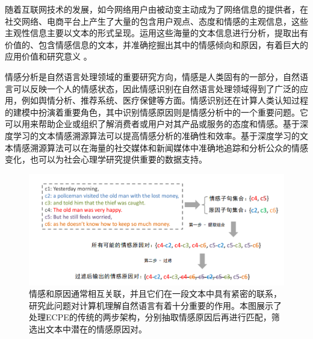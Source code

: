 



\label{sec:1.1}

随着互联网技术的发展，如今网络用户由被动变主动成为了网络信息的提供者，在社交网络、电商平台上产生了大量的包含用户观点、态度和情感的主观信息，这些主观性信息主要以文本的形式呈现。运用这些海量的文本信息进行分析，提取出有价值的、包含情感信息的文本，并准确挖掘出其中的情感倾向和原因，有着巨大的应用价值和研究意义  。

情感分析是自然语言处理领域的重要研究方向，情感是人类固有的一部分，自然语言可以反映一个人的情感状态，因此情感识别在自然语言处理领域得到了广泛的应用，例如舆情分析、推荐系统、医疗保健等方面。情感识别还在计算人类认知过程的建模中扮演着重要角色，其中识别情感原因则是情感分析中的一个重要问题。它可以用来帮助企业或组织了解消费者或用户对其产品或服务的态度和情感。基于深度学习的文本情感溯源算法可以提高情感分析的准确性和效率。基于深度学习的文本情感溯源算法可以在海量的社交媒体和新闻媒体中准确地追踪和分析公众的情感变化，也可以为社会心理学研究提供重要的数据支持。



\begin{figure}[ht]
	\centering
    \includegraphics[width=0.95\linewidth]{figures/2step.png}
	\caption{情感和原因通常相互关联，并且它们在一段文本中具有紧密的联系，研究此问题对计算机理解自然语言有着十分重要的作用。本图展示了处理ECPE的传统的两步架构，分别抽取情感原因后再进行匹配，筛选出文本中潜在的情感原因对。}
    \label{fig:2step}
\end{figure}


